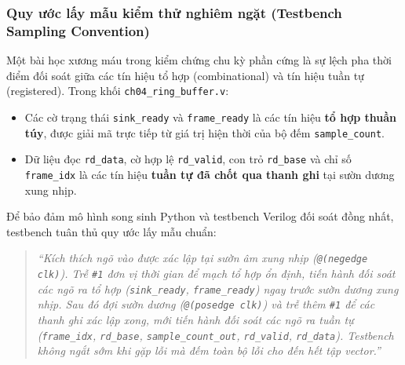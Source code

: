 \subsubsection*{Quy ước lấy mẫu kiểm thử nghiêm ngặt (Testbench Sampling Convention)}
Một bài học xương máu trong kiểm chứng chu kỳ phần cứng là sự lệch pha thời điểm đối soát giữa các tín hiệu tổ hợp (combinational) và tín hiệu tuần tự (registered). Trong khối \texttt{ch04\_ring\_buffer.v}:
\begin{itemize}[leftmargin=1.5em, itemsep=2pt]
    \item Các cờ trạng thái \texttt{sink\_ready} và \texttt{frame\_ready} là các tín hiệu \textbf{tổ hợp thuần túy}, được giải mã trực tiếp từ giá trị hiện thời của bộ đếm \texttt{sample\_count}.
    \item Dữ liệu đọc \texttt{rd\_data}, cờ hợp lệ \texttt{rd\_valid}, con trỏ \texttt{rd\_base} và chỉ số \texttt{frame\_idx} là các tín hiệu \textbf{tuần tự đã chốt qua thanh ghi} tại sườn dương xung nhịp.
\end{itemize}

Để bảo đảm mô hình song sinh Python và testbench Verilog đối soát đồng nhất, testbench  tuân thủ quy ước lấy mẫu chuẩn:
\begin{quote}
\emph{``Kích thích ngõ vào được xác lập tại sườn âm xung nhịp (\texttt{@(negedge clk)}). Trễ \texttt{\#1} đơn vị thời gian để mạch tổ hợp ổn định, tiến hành đối soát các ngõ ra tổ hợp (\texttt{sink\_ready}, \texttt{frame\_ready}) ngay trước sườn dương xung nhịp. Sau đó đợi sườn dương (\texttt{@(posedge clk)}) và trễ thêm \texttt{\#1} để các thanh ghi xác lập xong, mới tiến hành đối soát các ngõ ra tuần tự (\texttt{frame\_idx}, \texttt{rd\_base}, \texttt{sample\_count\_out}, \texttt{rd\_valid}, \texttt{rd\_data}). Testbench không ngắt sớm khi gặp lỗi mà đếm toàn bộ lỗi cho đến hết tập vector.''}
\end{quote}

